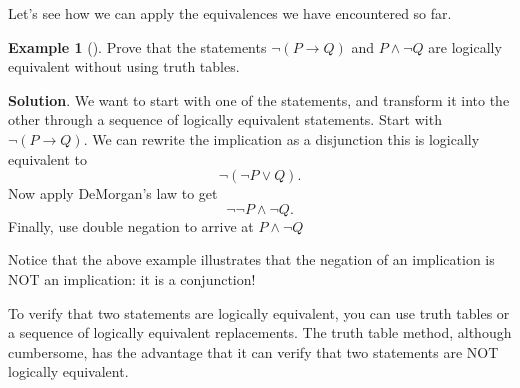 \documentclass[10pt,]{book}
\theoremstyle{plain}
\theoremstyle{definition}
\theoremstyle{definition}
\newtheorem{example}[theorem]{Example}
\theoremstyle{definition}
\theoremstyle{definition}
\numberwithin{equation}{chapter}
\def\imp{\rightarrow}
\begin{document}
\hypertarget{p-1817}{}%
Let's see how we can apply the equivalences we have encountered so far.%
\begin{example}[]\label{example-58}
\hypertarget{p-1818}{}%
Prove that the statements \(\neg(P \imp Q)\) and \(P\wedge \neg Q\) are logically equivalent without using truth tables.%
\par\smallskip%
\noindent\textbf{Solution}.\hypertarget{solution-168}{}\quad%
\hypertarget{p-1819}{}%
We want to start with one of the statements, and transform it into the other through a sequence of logically equivalent statements. Start with \(\neg(P \imp Q)\). We can rewrite the implication as a disjunction this is logically equivalent to%
\begin{equation*}
\neg(\neg P \vee Q).
\end{equation*}
Now apply DeMorgan's law to get%
\begin{equation*}
\neg\neg P \wedge \neg Q.
\end{equation*}
Finally, use double negation to arrive at \(P \wedge \neg Q\)%
\end{example}
\hypertarget{p-1820}{}%
Notice that the above example illustrates that the negation of an implication is NOT an implication: it is a conjunction!%
\par
\hypertarget{p-1821}{}%
To verify that two statements are logically equivalent, you can use truth tables or a sequence of logically equivalent replacements. The truth table method, although cumbersome, has the advantage that it can verify that two statements are NOT logically equivalent.%
\end{document}
